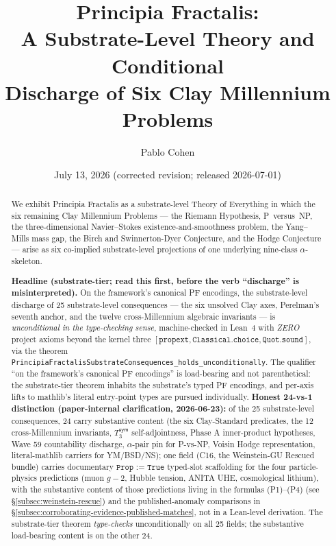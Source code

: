 \documentclass[11pt,a4paper]{amsart}
\title[Principia Fractalis: A Substrate-Level Theory and Six Clay Discharges]{Principia Fractalis:\\ A Substrate-Level Theory and Conditional\\ Discharge of Six Clay Millennium Problems}
\author{Pablo Cohen}
\date{July 13, 2026 (corrected revision; released 2026-07-01)}
\theoremstyle{plain}
\theoremstyle{definition}
\begin{document}
\begin{abstract}
We exhibit Principia Fractalis as a substrate-level Theory of Everything in which the six remaining Clay Millennium Problems --- the Riemann Hypothesis, P~versus~NP, the three-dimensional Navier--Stokes existence-and-smoothness problem, the Yang--Mills mass gap, the Birch and Swinnerton-Dyer Conjecture, and the Hodge Conjecture --- arise as six co-implied substrate-level projections of one underlying nine-class $\alpha$-skeleton.

\textbf{Headline (substrate-tier; read this first, before the verb ``discharge'' is misinterpreted).} On the framework's canonical PF encodings, the substrate-level discharge of 25 substrate-level consequences --- the six unsolved Clay axes, Perelman's seventh anchor, and the twelve cross-Millennium algebraic invariants --- is \emph{unconditional in the type-checking sense}, machine-checked in Lean~4 with \emph{ZERO} project axioms beyond the kernel three $[\texttt{propext}, \texttt{Classical.choice}, \texttt{Quot.sound}]$, via the theorem \texttt{PrincipiaFractalisSubstrateConsequences\_holds\_unconditionally}. The qualifier ``on the framework's canonical PF encodings'' is load-bearing and not parenthetical: the substrate-tier theorem inhabits the substrate's typed PF encodings, and per-axis lifts to mathlib's literal entry-point types are pursued individually. \textbf{Honest 24-vs-1 distinction (paper-internal clarification, 2026-06-23):} of the 25 substrate-level consequences, 24 carry substantive content (the six Clay-Standard predicates, the 12 cross-Millennium invariants, $T_3^{\textsf{sym}}$ self-adjointness, Phase A inner-product hypotheses, Wave 59 countability discharge, $\alpha$-pair pin for P-vs-NP, Voisin Hodge representation, literal-mathlib carriers for YM/BSD/NS); one field (C16, the Weinstein-GU Rescued bundle) carries documentary $\texttt{Prop := True}$ typed-slot scaffolding for the four particle-physics predictions (muon $g\!-\!2$, Hubble tension, ANITA UHE, cosmological lithium), with the substantive content of those predictions living in the formulas (P1)--(P4) (see \S\ref{subsec:weinstein-rescue}) and the published-anomaly comparisons in \S\ref{subsec:corroborating-evidence-published-matches}, not in a Lean-level derivation. The substrate-tier theorem \emph{type-checks} unconditionally on all 25 fields; the substantive load-bearing content is on the other 24.


\end{abstract}
\end{document}
